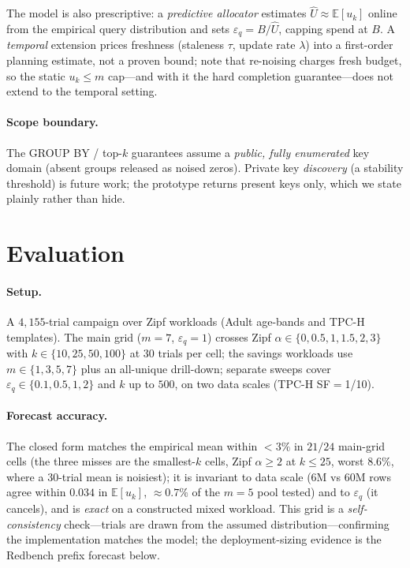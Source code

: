 \documentclass[runningheads]{llncs}
\newcommand{\eps}{\varepsilon}
\newcommand{\E}{\mathbb{E}}
\begin{document}
The model is also prescriptive: a \emph{predictive allocator} estimates $\hat U\approx\E[u_k]$ online from the empirical query distribution and sets $\eps_q=B/\hat U$, capping spend at $B$. A \emph{temporal} extension prices freshness (staleness $\tau$, update rate $\lambda$) into a first-order planning estimate, not a proven bound; note that re-noising charges fresh budget, so the static $u_k\le m$ cap---and with it the hard completion guarantee---does not extend to the temporal setting.

\paragraph{Scope boundary.} The GROUP BY / top-$k$ guarantees assume a \emph{public, fully enumerated} key domain (absent groups released as noised zeros). Private key \emph{discovery} (a stability threshold) is future work; the prototype returns present keys only, which we state plainly rather than hide.

\section{Evaluation}
\label{sec:eval}

\paragraph{Setup.} A $4{,}155$-trial campaign over Zipf workloads (Adult age-bands and TPC-H templates). The main grid ($m{=}7$, $\eps_q{=}1$) crosses Zipf $\alpha\in\{0,0.5,1,1.5,2,3\}$ with $k\in\{10,25,50,100\}$ at $30$ trials per cell; the savings workloads use $m\in\{1,3,5,7\}$ plus an all-unique drill-down; separate sweeps cover $\eps_q\in\{0.1,0.5,1,2\}$ and $k$ up to $500$, on two data scales (TPC-H SF$=$1/10).

\paragraph{Forecast accuracy.} The closed form matches the empirical mean within $<3\%$ in $21/24$ main-grid cells (the three misses are the smallest-$k$ cells, Zipf $\alpha{\ge}2$ at $k{\le}25$, worst $8.6\%$, where a 30-trial mean is noisiest); it is invariant to data scale (6M vs 60M rows agree within $0.034$ in $\E[u_k]$, ${\approx}0.7\%$ of the $m{=}5$ pool tested) and to $\eps_q$ (it cancels), and is \emph{exact} on a constructed mixed workload. This grid is a \emph{self-consistency} check---trials are drawn from the assumed distribution---confirming the implementation matches the model; the deployment-sizing evidence is the Redbench prefix forecast below.
\end{document}
